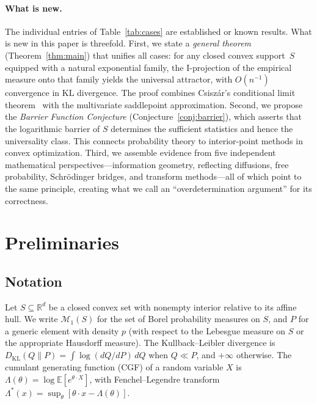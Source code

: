 \documentclass[aps,pre,twocolumn,superscriptaddress,nofootinbib]{revtex4-2}
\theoremstyle{definition}
\theoremstyle{remark}
\newcommand{\R}{\mathbb{R}}
\newcommand{\E}{\mathbb{E}}
\newcommand{\KL}{D_{\mathrm{KL}}}
\begin{document}
\paragraph{What is new.}
The individual entries of Table~\ref{tab:cases} are established or known
results.  What is new in this paper is threefold.  First, we state a
\emph{general theorem} (Theorem~\ref{thm:main}) that unifies all cases: for
any closed convex support~$S$ equipped with a natural exponential family, the
I-projection of the empirical measure onto that family yields the universal
attractor, with $O(n^{-1})$ convergence in KL divergence.  The proof combines
Csisz\'{a}r's conditional limit theorem~\cite{Csiszar1984} with the multivariate
saddlepoint approximation.  Second, we propose the \emph{Barrier Function
Conjecture} (Conjecture~\ref{conj:barrier}), which asserts that the logarithmic
barrier of $S$ determines the sufficient statistics and hence the universality
class.  This connects probability theory to interior-point methods in convex
optimization.  Third, we assemble evidence from five independent mathematical
perspectives---information geometry, reflecting diffusions, free probability,
Schr\"{o}dinger bridges, and transform methods---all of which point to the
same principle, creating what we call an ``overdetermination argument'' for
its correctness.

\section{Preliminaries}\label{sec:prelim}

\subsection{Notation}

Let $S\subseteq\R^d$ be a closed convex set with nonempty interior relative to
its affine hull. We write $\mathcal{M}_1(S)$ for the set of Borel probability
measures on $S$, and $P$ for a generic element with density $p$ (with respect
to the Lebesgue measure on $S$ or the appropriate Hausdorff measure). The
Kullback--Leibler divergence is $\KL(Q\|P)=\int\log(dQ/dP)\,dQ$ when
$Q\ll P$, and $+\infty$ otherwise. The cumulant generating function (CGF) of
a random variable $X$ is $\Lambda(\theta)=\log\E[e^{\theta\cdot X}]$, with
Fenchel--Legendre transform $\Lambda^*(x)=\sup_\theta[\theta\cdot x-\Lambda(\theta)]$.
\end{document}
